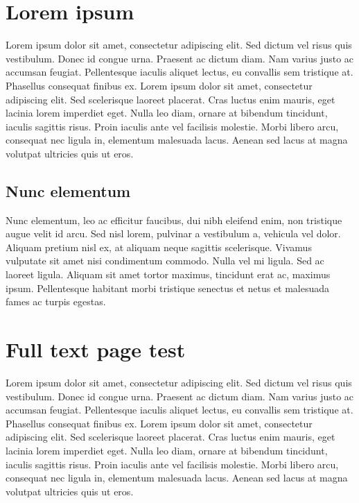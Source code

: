 \documentclass[a4paper,oneside,12pt]{report}
\begin{document}


\tableofcontents


\newpage


\setcounter{page}{1}

\chapter{Lorem ipsum}

 Lorem ipsum dolor sit amet, consectetur adipiscing elit. Sed dictum vel risus quis vestibulum. Donec id congue urna. Praesent ac dictum diam. Nam varius justo ac accumsan feugiat. Pellentesque iaculis aliquet lectus, eu convallis sem tristique at. Phasellus consequat finibus ex. Lorem ipsum dolor sit amet, consectetur adipiscing elit. Sed scelerisque laoreet placerat. Cras luctus enim mauris, eget lacinia lorem imperdiet eget. Nulla leo diam, ornare at bibendum tincidunt, iaculis sagittis risus. Proin iaculis ante vel facilisis molestie. Morbi libero arcu, consequat nec ligula in, elementum malesuada lacus. Aenean sed lacus at magna volutpat ultricies quis ut eros.

 \section{Nunc elementum}

 Nunc elementum, leo ac efficitur faucibus, dui nibh eleifend enim, non tristique augue velit id arcu. Sed nisl lorem, pulvinar a vestibulum a, vehicula vel dolor. Aliquam pretium nisl ex, at aliquam neque sagittis scelerisque. Vivamus vulputate sit amet nisi condimentum commodo. Nulla vel mi ligula. Sed ac laoreet ligula. Aliquam sit amet tortor maximus, tincidunt erat ac, maximus ipsum. Pellentesque habitant morbi tristique senectus et netus et malesuada fames ac turpis egestas.

 \chapter{Full text page test}



Lorem ipsum dolor sit amet, consectetur adipiscing elit. Sed dictum vel risus quis vestibulum. Donec id congue urna. Praesent ac dictum diam. Nam varius justo ac accumsan feugiat. Pellentesque iaculis aliquet lectus, eu convallis sem tristique at. Phasellus consequat finibus ex. Lorem ipsum dolor sit amet, consectetur adipiscing elit. Sed scelerisque laoreet placerat. Cras luctus enim mauris, eget lacinia lorem imperdiet eget. Nulla leo diam, ornare at bibendum tincidunt, iaculis sagittis risus. Proin iaculis ante vel facilisis molestie. Morbi libero arcu, consequat nec ligula in, elementum malesuada lacus. Aenean sed lacus at magna volutpat ultricies quis ut eros.
\end{document}
